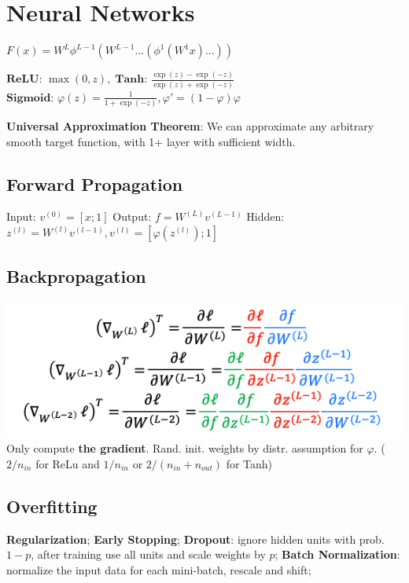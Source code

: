 \section*{Neural Networks}
$F(x)=W^{L}\phi^{L-1}(W^{L-1}...(\phi^{1}(W^{1}x)...))$

$\textbf{ReLU: } \max (0,z), \; \textbf{Tanh: } \frac{\exp(z) - \exp(-z)}{\exp(z) + \exp(-z)}$ \\[-3pt]
$\textbf{Sigmoid: } \varphi(z) = \frac{1}{1 + \exp(-z)}, \varphi' = (1 - \varphi) \varphi$


\textbf{Universal Approximation Theorem}: We can approximate any arbitrary smooth target function, with 1+ layer with sufficient width.

\subsection*{Forward Propagation}

Input: $v^{(0)} = [x; 1]$ \quad Output: $f = W^{(L)} v^{(L-1)}$
Hidden: $z^{(l)} = W^{(l)} v^{(l-1)}, v^{(l)} = [\varphi(z^{(l)}); 1]$

\subsection*{Backpropagation}

\includegraphics[width=\columnwidth]{assets/backpropagation.png} \\[-15pt]



Only compute {\color{red} \textbf{the gradient}}. Rand. init. weights by distr. assumption for $\varphi$. ( $2 / n_{in}$ for ReLu and $1/n_{in}$ or $ 2/ (n_{in} + n_{out})$ for Tanh)

\subsection*{Overfitting}
\textbf{Regularization}; \textbf{Early Stopping}; \textbf{Dropout}: 
ignore hidden units with prob. $1-p$, after training use all units 
and scale weights by $p$; 
\textbf{Batch Normalization}: normalize the input data 
for each mini-batch, rescale and shift;

